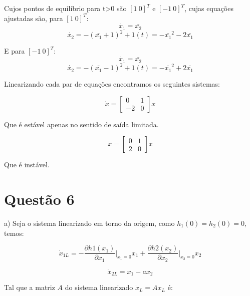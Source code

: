 \noindent Cujos pontos de equilíbrio para t>0 são $[1~0]^T$ e $[-1~0]^T$, cujas equações ajustadas são, para $[1~0]^T$:\\

\begin{equation}
\dot{x_1} = \bar{x_2}
\end{equation}
\begin{equation}
\dot{x_2} = -(\bar{x_1}+1)^2+1(t) = -\bar{x_1}^2 - 2\bar{x_1}
\end{equation}

\noindent E para $[-1~0]^T$:\\

\begin{equation}
\dot{x_1} = \bar{x_2}
\end{equation}
\begin{equation}
\dot{x_2} = -(\bar{x_1}-1)^2+1(t) = -\bar{x_1}^2 + 2\bar{x_1}
\end{equation}

Linearizando cada par de equações encontramos os seguintes sistemas:

\[
\dot{x} = \begin{bmatrix}
0 & 1\\
-2 & 0
\end{bmatrix} x
\]

Que é estável apenas no sentido de saída limitada.

\[
\dot{x} = \begin{bmatrix}
0 & 1\\
2 & 0
\end{bmatrix}x
\]

Que é instável.

\section{Questão 6}

a) Seja o sistema linearizado em torno da origem, como $h_1(0) = h_2(0) = 0$, temos:

\begin{equation}
\dot{x}_{1L} = -\frac{\partial h1(x_1)}{\partial x_1} \bigg |_{x_1 = 0} x_1+\frac{\partial h2(x_2)}{\partial x_2} \bigg |_{x_2 = 0} x_2
\end{equation}

\begin{equation}
\dot{x}_{2L} = x_1 - ax_2
\end{equation}

Tal que a matriz $A$ do sistema linearizado $\dot{x}_L = Ax_L$ é:

